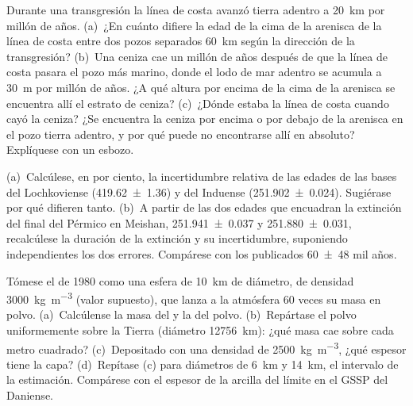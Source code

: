 \begin{exercise}[$\star\star$]\label{exo:b1:stratigraphic-scale:6}
Durante una transgresión la línea de costa avanzó tierra adentro a \qty{20}{km} por millón de años. (a)~¿En cuánto difiere la edad de la cima de la arenisca de la línea de costa entre dos pozos separados \qty{60}{km} según la dirección de la transgresión? (b)~Una ceniza cae un millón de años después de que la línea de costa pasara el pozo más marino, donde el lodo de mar adentro se acumula a \qty{30}{m} por millón de años. ¿A qué altura por encima de la cima de la arenisca se encuentra allí el estrato de ceniza? (c)~¿Dónde estaba la línea de costa cuando cayó la ceniza? ¿Se encuentra la ceniza por encima o por debajo de la arenisca en el pozo tierra adentro, y por qué puede no encontrarse allí en absoluto? Explíquese con un esbozo.
\end{exercise}

\begin{exercise}[$\star\star$]\label{exo:b1:stratigraphic-scale:7}
(a)~Calcúlese, en por ciento, la incertidumbre relativa de las edades de las bases del Lochkoviense (\qty[uncertainty-mode=separate]{419.62(136)}{\Ma}) y del Induense (\qty[uncertainty-mode=separate]{251.902(24)}{\Ma}).
Sugiérase por qué difieren tanto. (b)~A partir de las dos edades que encuadran la extinción del final del Pérmico en Meishan, \qty[uncertainty-mode=separate]{251.941(37)}{\Ma} y
\qty[uncertainty-mode=separate]{251.880(31)}{\Ma}, recalcúlese la duración de la extinción y su incertidumbre, suponiendo independientes los dos errores. Compárese con los publicados
\num[uncertainty-mode=separate]{60 \pm 48} mil años.
\end{exercise}

\begin{exercise}[$\star\star$]\label{exo:b1:stratigraphic-scale:8}
Tómese el  de 1980 como una esfera de \qty{10}{km} de diámetro, de densidad \qty{3000}{kg.m^{-3}} (valor supuesto), que lanza a la atmósfera 60 veces su masa en polvo. (a)~Calcúlense la masa del
 y la del polvo. (b)~Repártase el polvo uniformemente sobre la Tierra (diámetro \qty{12756}{km}): ¿qué masa cae sobre cada metro cuadrado? (c)~Depositado con una densidad de
\qty{2500}{kg.m^{-3}}, ¿qué espesor tiene la capa? (d)~Repítase (c) para diámetros de \qty{6}{km} y \qty{14}{km}, el intervalo de la estimación. Compárese con el espesor de la arcilla del límite en el GSSP del Daniense.
\end{exercise}

